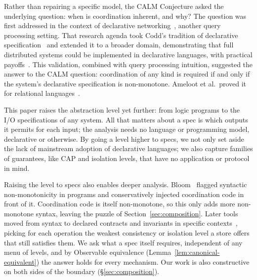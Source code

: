 \documentclass[sigconf]{cidr-2027}
\theoremstyle{remark}
\newcommand{\spectype}[1][]{I/O specification#1\xspace}
\begin{document}
\textcolor{reviewed}{Rather than repairing a specific model, the CALM Conjecture asked the underlying
question: when is coordination inherent, and why?} \textcolor{reviewed}{The question was
first addressed in the context of declarative
networking~\cite{loo2009declarative}, another query processing setting.} \textcolor{reviewed}{That
research agenda took Codd's tradition of declarative
specification~\cite{codd1970relational} and extended it to a broader domain,
demonstrating that full distributed systems could be implemented in declarative
languages, with practical
payoffs~\cite{loo2005overlays,loo2009declarative,chu2007declarative,alvaro2010boom,alvaro2011bloom}.} \textcolor{reviewed}{This validation, combined with query processing intuition, suggested the answer
to the CALM question: coordination of any kind is required if and only if the
system's declarative specification is non-monotone.} \textcolor{reviewed}{Ameloot et al.\ proved it
for relational languages~\cite{ameloot2013relational}.}

\textcolor{reviewed}{This paper raises the abstraction level yet further: from logic programs to the
\spectype[s] of any system.} \textcolor{reviewed}{All that matters about a spec is which outputs it
permits for each input; the analysis needs no language or programming model,
declarative or otherwise.} \textcolor{reviewed}{By going a level higher to specs, we not only set
aside the lack of mainstream adoption of declarative languages; we also capture
families of guarantees, like CAP and isolation levels, that have no application
or protocol in mind.}

\textcolor{reviewed}{Raising the level to specs also enables deeper analysis.} Bloom~\cite{alvaro2011bloom} flagged syntactic non-monotonicity in programs and
conservatively injected coordination code in front of it. Coordination code is
itself non-monotone, so this only adds more non-monotone syntax, leaving the
puzzle of Section~\ref{sec:composition}. \textcolor{reviewed}{Later tools moved from syntax to
declared contracts and invariants in specific
contexts~\cite{sivaramakrishnan2015quelea,kaki2018alone}, picking for each
operation the weakest consistency or isolation level a store offers that still
satisfies them.} We ask what a spec itself requires, independent of any menu of
levels, and by Observable equivalence (Lemma~\ref{lem:canonical-equivalent}) the
answer holds for every mechanism. Our work is also constructive on both sides of the
boundary (\S\ref{sec:composition}).
\end{document}
